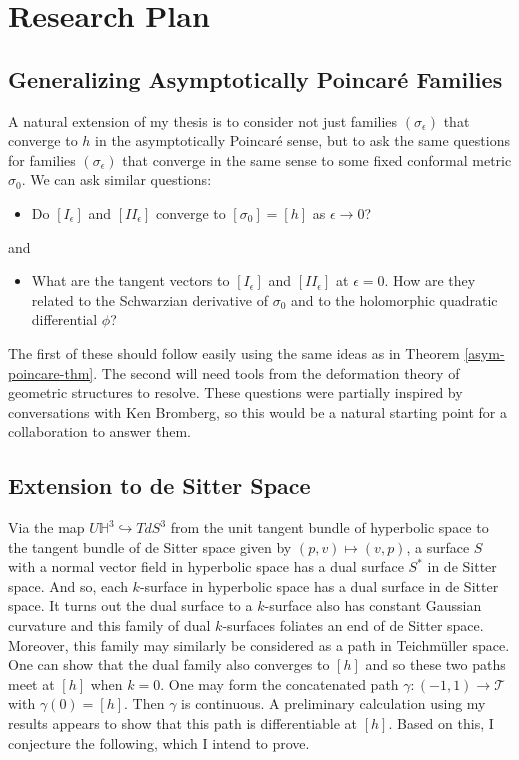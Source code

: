 \documentclass[11pt]{amsart}
\renewcommand{\H}{\mathbb{H}}
\begin{document}
\section{Research Plan} \label{research plan}


\subsection{Generalizing Asymptotically Poincar\'e Families} \label{generalize families}
A natural extension of my thesis is to consider not just families $(\sigma_\epsilon)$ that converge to $h$ in the asymptotically Poincar\'e sense, but to ask the same questions for families $(\sigma_\epsilon)$ that converge in the same sense to some fixed conformal metric $\sigma_0$. 
We can ask similar questions:
\begin{itemize}
\item Do $[I_\epsilon]$ and $[I\!I_\epsilon]$ converge to $[\sigma_0] = [h]$ as $\epsilon \to 0$?
\end{itemize}
and 
\begin{itemize}
\item What are the tangent vectors to $[I_\epsilon]$ and $[I\!I_\epsilon]$ at $\epsilon =0$. How are they related to the Schwarzian derivative of $\sigma_0$ and to the holomorphic quadratic differential $\phi$? 
\end{itemize}
The first of these should follow easily using the same ideas as in Theorem \ref{asym-poincare-thm}. The second will need tools from the deformation theory of geometric structures to resolve. These questions were partially inspired by conversations with Ken Bromberg, so this would be a natural starting point for a collaboration to answer them. 

\subsection{Extension to de Sitter Space}
Via the map $U\H^3 \hookrightarrow T dS^3$ from the unit tangent bundle of hyperbolic space to the tangent bundle of de Sitter space given by $(p,v) \mapsto (v,p)$, a surface $S$ with a normal vector field in hyperbolic space has a dual surface $S^*$ in de Sitter space. And so, each $k$-surface in hyperbolic space has a dual surface in de Sitter space. It turns out the dual surface to a $k$-surface also has constant Gaussian curvature and this family of dual $k$-surfaces foliates an end of de Sitter space. Moreover, this family may similarly be considered as a path in Teichm\"uller space. One can show that the dual family also converges to $[h]$ and so these two paths meet at $[h]$ when $k = 0$. One may form the concatenated path $\gamma :(-1,1) \to \mathcal{T}$ with $\gamma(0) = [h]$. Then $\gamma$ is continuous. A preliminary calculation using my results appears to show that this path is differentiable at $[h]$. Based on this, I conjecture the following, which I intend to prove.
\end{document}
